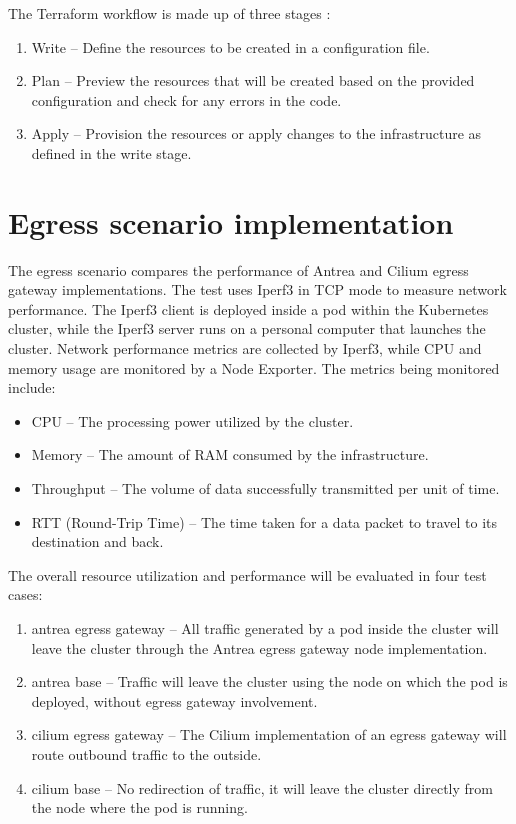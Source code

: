 The Terraform workflow is made up of three stages \cite{Terraform}:
\begin{enumerate}
  \item Write -- Define the resources to be created in a configuration file.
  \item Plan -- Preview the resources that will be created based on the provided configuration and check for any errors in the code.
  \item Apply -- Provision the resources or apply changes to the infrastructure as defined in the write stage.
\end{enumerate}





\section{Egress scenario implementation}
\label{sec:egressImpl}


The egress scenario compares the performance of Antrea and Cilium egress gateway implementations. The test uses Iperf3 in TCP mode to measure network performance. The Iperf3 client is deployed inside a pod within the Kubernetes cluster, while the Iperf3 server runs on a personal computer that launches the cluster. Network performance metrics are collected by Iperf3, while CPU and memory usage are monitored by a Node Exporter. The metrics being monitored include:
\begin{itemize}
  \item CPU -- The processing power utilized by the cluster.
  \item Memory -- The amount of RAM consumed by the infrastructure.
  \item Throughput -- The volume of data successfully transmitted per unit of time.
  \item RTT (Round-Trip Time) -- The time taken for a data packet to travel to its destination and back.
\end{itemize}

The overall resource utilization and performance will be evaluated in four test cases:

\begin{enumerate}
  \item antrea egress gateway -- All traffic generated by a pod inside the cluster will leave the cluster through the Antrea egress gateway node implementation.
  \item antrea base -- Traffic will leave the cluster using the node on which the pod is deployed, without egress gateway involvement.
  \item cilium egress gateway -- The Cilium implementation of an egress gateway will route outbound traffic to the outside.
  \item cilium base -- No redirection of traffic, it will leave the cluster directly from the node where the pod is running.
\end{enumerate}

